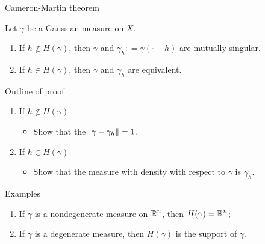 \documentclass{beamer}
\begin{document}
\begin{frame}{Cameron-Martin theorem}
    \begin{theorem}
    Let $\gamma$ be a Gaussian measure on $X$. 
    \begin{enumerate}
        \item If $h\notin H(\gamma)$, then $\gamma$ and $\gamma_h: = \gamma(\cdot-h)$ are mutually singular.
        \item If $h\in H(\gamma)$, then $\gamma$ and $\gamma_h$ are equivalent.
    \end{enumerate}    
    \end{theorem}
\end{frame}
\begin{frame}{Outline of proof}
    \begin{enumerate}
        \item If $h\notin H(\gamma)$
        \begin{itemize}
            \item Show that the  $\norm{\gamma-\gamma_h} = 1$.
        \end{itemize}\pause
        \item If $h\in H(\gamma)$ 
        \begin{itemize}
            \item Show that the measure with density with respect to $\gamma$  is $\gamma_h$.
        \end{itemize}
    \end{enumerate} 
\end{frame}

\begin{frame}{Examples}
    \begin{example}
    \begin{enumerate}
        \item If $\gamma$ is a nondegenerate measure on $\operatorname{\mathbb{R}}^n$, then $H(\gamma) = \operatorname{\mathbb{R}}^n$;
        \item If $\gamma$ is a degenerate measure, then $H(\gamma)$ is the support of $\gamma$.
    \end{enumerate}
    \end{example}
\end{frame}
\end{document}
